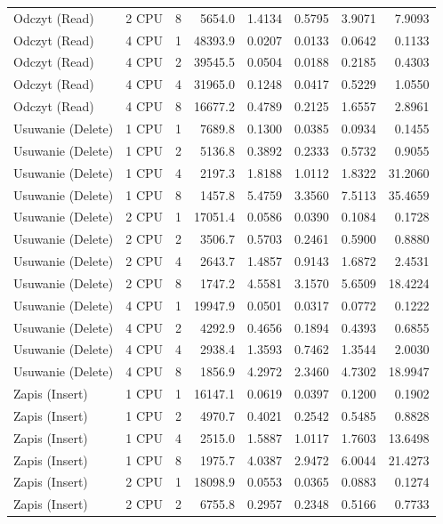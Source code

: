 \begin{table}[ht]
{\begin{tabular}{llcrrrrr}
Odczyt (Read) & 2 CPU & 8 & 5654.0 & 1.4134 & 0.5795 & 3.9071 & 7.9093 \\
Odczyt (Read) & 4 CPU & 1 & 48393.9 & 0.0207 & 0.0133 & 0.0642 & 0.1133 \\
Odczyt (Read) & 4 CPU & 2 & 39545.5 & 0.0504 & 0.0188 & 0.2185 & 0.4303 \\
Odczyt (Read) & 4 CPU & 4 & 31965.0 & 0.1248 & 0.0417 & 0.5229 & 1.0550 \\
Odczyt (Read) & 4 CPU & 8 & 16677.2 & 0.4789 & 0.2125 & 1.6557 & 2.8961 \\
Usuwanie (Delete) & 1 CPU & 1 & 7689.8 & 0.1300 & 0.0385 & 0.0934 & 0.1455 \\
Usuwanie (Delete) & 1 CPU & 2 & 5136.8 & 0.3892 & 0.2333 & 0.5732 & 0.9055 \\
Usuwanie (Delete) & 1 CPU & 4 & 2197.3 & 1.8188 & 1.0112 & 1.8322 & 31.2060 \\
Usuwanie (Delete) & 1 CPU & 8 & 1457.8 & 5.4759 & 3.3560 & 7.5113 & 35.4659 \\
Usuwanie (Delete) & 2 CPU & 1 & 17051.4 & 0.0586 & 0.0390 & 0.1084 & 0.1728 \\
Usuwanie (Delete) & 2 CPU & 2 & 3506.7 & 0.5703 & 0.2461 & 0.5900 & 0.8880 \\
Usuwanie (Delete) & 2 CPU & 4 & 2643.7 & 1.4857 & 0.9143 & 1.6872 & 2.4531 \\
Usuwanie (Delete) & 2 CPU & 8 & 1747.2 & 4.5581 & 3.1570 & 5.6509 & 18.4224 \\
Usuwanie (Delete) & 4 CPU & 1 & 19947.9 & 0.0501 & 0.0317 & 0.0772 & 0.1222 \\
Usuwanie (Delete) & 4 CPU & 2 & 4292.9 & 0.4656 & 0.1894 & 0.4393 & 0.6855 \\
Usuwanie (Delete) & 4 CPU & 4 & 2938.4 & 1.3593 & 0.7462 & 1.3544 & 2.0030 \\
Usuwanie (Delete) & 4 CPU & 8 & 1856.9 & 4.2972 & 2.3460 & 4.7302 & 18.9947 \\
Zapis (Insert) & 1 CPU & 1 & 16147.1 & 0.0619 & 0.0397 & 0.1200 & 0.1902 \\
Zapis (Insert) & 1 CPU & 2 & 4970.7 & 0.4021 & 0.2542 & 0.5485 & 0.8828 \\
Zapis (Insert) & 1 CPU & 4 & 2515.0 & 1.5887 & 1.0117 & 1.7603 & 13.6498 \\
Zapis (Insert) & 1 CPU & 8 & 1975.7 & 4.0387 & 2.9472 & 6.0044 & 21.4273 \\
Zapis (Insert) & 2 CPU & 1 & 18098.9 & 0.0553 & 0.0365 & 0.0883 & 0.1274 \\
Zapis (Insert) & 2 CPU & 2 & 6755.8 & 0.2957 & 0.2348 & 0.5166 & 0.7733 \\

\end{tabular}}
\end{table}
